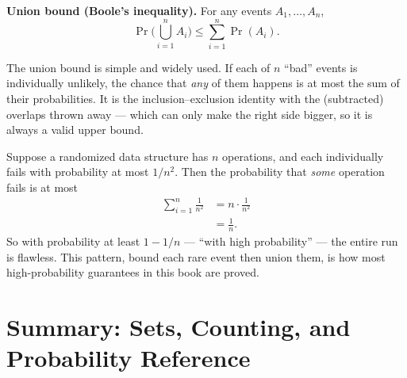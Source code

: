 \begin{formalbox}
\textbf{Union bound (Boole's inequality).} For any events $A_1, \dots, A_n$,
\[
\Pr\!\Big( \bigcup_{i=1}^{n} A_i \Big) \le \sum_{i=1}^{n} \Pr(A_i).
\]
\end{formalbox}

The union bound is simple and widely used. If each of $n$ ``bad'' events is individually unlikely,
the chance that \emph{any} of them happens is at most the sum of their probabilities.
It is the inclusion--exclusion identity with the (subtracted) overlaps thrown away ---
which can only make the right side bigger, so it is always a valid upper bound.

\begin{example}
\label{ch38:ex-union}
Suppose a randomized data structure has $n$ operations, and each individually fails
with probability at most $1/n^2$. Then the probability that \emph{some} operation
fails is at most
\begin{align*}
\sum_{i=1}^{n} \frac{1}{n^2} &= n \cdot \frac{1}{n^2} \\
&= \frac{1}{n}.
\end{align*}
So with probability at least $1 - 1/n$ --- ``with high probability'' --- the entire run
is flawless. This pattern, bound each rare event then union them, is how most
high-probability guarantees in this book are proved.
\end{example}

\section{Summary: Sets, Counting, and Probability Reference}

